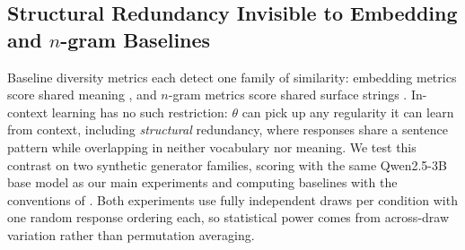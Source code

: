 
\subsection{Structural Redundancy Invisible to Embedding and $n$-gram Baselines}\label{sec:structural-redundancy}

Baseline diversity metrics each detect one family of similarity: embedding metrics score shared meaning \citep{reimers2019sbert}, and $n$-gram metrics score shared surface strings \citep{li2016diversity,zhu2018texygen}.
In-context learning has no such restriction: $\theta$ can pick up any regularity it can learn from context, including \emph{structural} redundancy, where responses share a sentence pattern while overlapping in neither vocabulary nor meaning.
We test this contrast on two synthetic generator families, scoring with the same Qwen2.5-3B base model \citep{yang2024qwen25} as our main experiments and computing baselines with the conventions of \citet{tevet2020evaluating}.
Both experiments use fully independent draws per condition with one random response ordering each, so statistical power comes from across-draw variation rather than permutation averaging.

